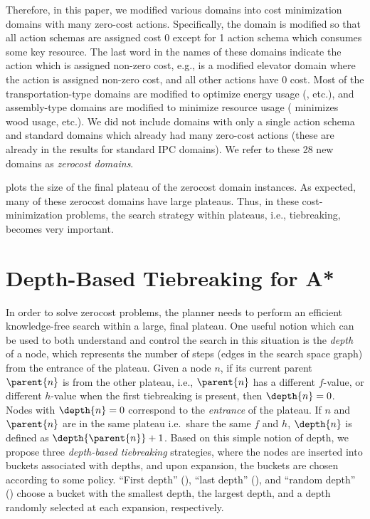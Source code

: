 Therefore, in this paper, we modified various domains
into cost minimization domains with many zero-cost actions.
Specifically, the domain is modified so that all action schemas are assigned
cost 0 except for 1 action schema which consumes some key resource.
The last word in the names of these domains indicate the action which is assigned non-zero cost, e.g.,  is a modified elevator domain where the  action is assigned non-zero cost, and all other actions have 0 cost.
Most of the transportation-type domains are modified to optimize 
energy usage (,  etc.), and  assembly-type domains are modified to minimize resource usage
( minimizes wood usage, etc.).
We did not
include domains with only a single action schema and standard domains which already had many
zero-cost actions (these are already in the results for standard IPC domains).
We refer to these 28 new domains as \emph{zerocost domains}.

 plots the size of the final plateau of the zerocost domain instances.
As expected, many of these zerocost domains have large plateaus.
Thus, in these cost-minimization problems, the search strategy within
plateaus, i.e., tiebreaking,  becomes very important.


\section{Depth-Based Tiebreaking for A*}

\label{sec:depth}

In order to solve zerocost problems, the planner needs to perform an
efficient knowledge-free search within a large, final plateau.
One useful notion which can be used to both understand and control the
search in this situation is the \emph{depth} of a node, which represents
the number of steps (edges in the search space graph) from the entrance of the plateau.  Given a node $n$,
if its current parent $\parent{n}$ is from the other plateau, i.e.,
$\parent{n}$ has a different $f$-value, or different $h$-value when the
first tiebreaking is present, then $\depth{n} = 0$. Nodes with
$\depth{n} = 0$ correspond to the \emph{entrance} of the plateau.  If $n$
and $\parent{n}$ are in the same plateau i.e.\ share the same $f$ and $h$,
$\depth{n}$ is defined as $\depth{\parent{n}} + 1$.  Based on this
simple notion of depth, we propose three \emph{depth-based
tiebreaking} strategies, where the nodes are inserted into buckets associated with
depths, and upon expansion, the buckets are chosen according to some policy.
``First depth'' (\fd), ``last depth'' (\ld), and ``random depth'' (\rd) 
choose a bucket with the smallest depth,
the largest depth, and a depth randomly selected at each expansion, respectively.

